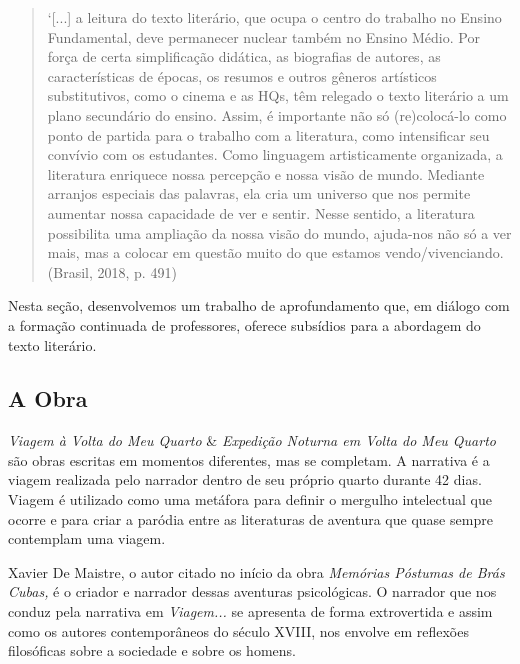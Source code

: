 \documentclass[12pt]{extarticle}
\begin{document}
\begin{quote}
`{[}...{]} a leitura do texto literário, que ocupa o centro do trabalho
no Ensino Fundamental, deve permanecer nuclear também no Ensino Médio.
Por força de certa simplificação didática, as biografias de autores, as
características de épocas, os resumos e outros gêneros artísticos
substitutivos, como o cinema e as HQs, têm relegado o texto literário a
um plano secundário do ensino. Assim, é importante não só (re)colocá-lo
como ponto de partida para o trabalho com a literatura, como
intensificar seu convívio com os estudantes. Como linguagem
artisticamente organizada, a literatura enriquece nossa percepção e
nossa visão de mundo. Mediante arranjos especiais das palavras, ela cria
um universo que nos permite aumentar nossa capacidade de ver e sentir.
Nesse sentido, a literatura possibilita uma ampliação da nossa visão do
mundo, ajuda-nos não só a ver mais, mas a colocar em questão muito do
que estamos vendo/vivenciando. (Brasil, 2018, p. 491)
\end{quote}

Nesta seção, desenvolvemos um trabalho de aprofundamento que, em diálogo
com a formação continuada de professores, oferece subsídios para a
abordagem do texto literário.

\subsection{A Obra}




\emph{Viagem à Volta do Meu Quarto} \& \emph{Expedição Noturna em Volta
do Meu Quarto} são obras escritas em momentos diferentes, mas se
completam. A narrativa é a viagem realizada pelo narrador dentro de seu
próprio quarto durante 42 dias. Viagem é utilizado como uma metáfora
para definir o mergulho intelectual que ocorre e para criar a paródia
entre as literaturas de aventura que quase sempre contemplam uma viagem.

Xavier De Maistre, o autor citado no início da obra \emph{Memórias
Póstumas de Brás Cubas,} é o criador e narrador dessas aventuras
psicológicas. O narrador que nos conduz pela narrativa em
\emph{Viagem...} se apresenta de forma extrovertida e assim como os
autores contemporâneos do século XVIII, nos envolve em reflexões
filosóficas sobre a sociedade e sobre os homens.
\end{document}
